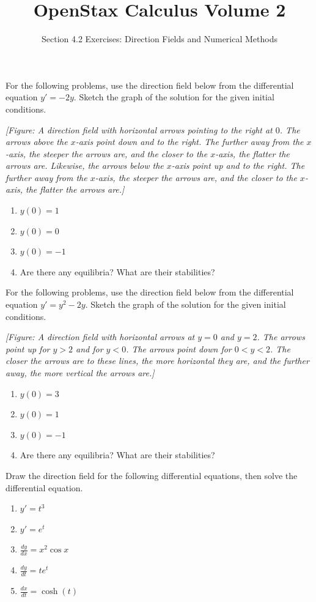 \documentclass{exercises}
\title{OpenStax Calculus Volume 2}
\subtitle{Section 4.2 Exercises: Direction Fields and Numerical Methods}
\author{}
\date{}
\begin{document}
\maketitle


For the following problems, use the direction field below from the differential equation $y'=-2y$. Sketch the graph of the solution for the given initial conditions.


\textit{[Figure: A direction field with horizontal arrows pointing to the right at $0$. The arrows above the $x$-axis point down and to the right. The further away from the $x$-axis, the steeper the arrows are, and the closer to the $x$-axis, the flatter the arrows are. Likewise, the arrows below the $x$-axis point up and to the right. The further away from the $x$-axis, the steeper the arrows are, and the closer to the $x$-axis, the flatter the arrows are.]}

\begin{enumerate}[start=1]
\item $y(0)=1$
\item $y(0)=0$
\item $y(0)=-1$
\item Are there any equilibria? What are their stabilities?
\end{enumerate}

For the following problems, use the direction field below from the differential equation $y'=y^{2}-2y$. Sketch the graph of the solution for the given initial conditions.


\textit{[Figure: A direction field with horizontal arrows at $y=0$ and $y=2$. The arrows point up for $y>2$ and for $y<0$. The arrows point down for $0<y<2$. The closer the arrows are to these lines, the more horizontal they are, and the further away, the more vertical the arrows are.]}

\begin{enumerate}[resume]
\item $y(0)=3$
\item $y(0)=1$
\item $y(0)=-1$
\item Are there any equilibria? What are their stabilities?
\end{enumerate}

Draw the direction field for the following differential equations, then solve the differential equation.

\begin{enumerate}[resume]
\item $y'=t^{3}$
\item $y'=e^{t}$
\item $\frac{dy}{dx}=x^{2}\cos x$
\item $\frac{dy}{dt}=te^{t}$
\item $\frac{dx}{dt}=\cosh(t)$
\end{enumerate}
\end{document}
